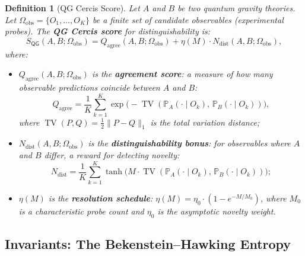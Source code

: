 \documentclass[12pt,a4paper]{article}
\newtheorem{definition}[theorem]{Definition}
\theoremstyle{remark}
\newcommand{\Pbb}{\mathbb{P}}
\newcommand{\Cercis}{\textsf{Cercis}}
\newcommand{\QG}{\textsf{QG}}
\DeclareMathOperator{\TV}{TV}
\begin{document}
\begin{definition}[QG Cercis Score]
\label{def:qg_cercis}
Let $A$ and $B$ be two quantum gravity theories. Let $\Omega_{\text{obs}} = \{O_1, \ldots, O_K\}$ be a finite set of candidate observables (experimental probes). The \textbf{QG \Cercis{} score} for distinguishability is:
\begin{equation}
  \label{eq:qg_cercis_formula}
  S_{\QG}(A, B; \Omega_{\text{obs}}) = Q_{\text{agree}}(A, B; \Omega_{\text{obs}}) +
  \eta(M) \cdot N_{\text{dist}}(A, B; \Omega_{\text{obs}}),
\end{equation}
where:
\begin{itemize}[leftmargin=*]
  \item $Q_{\text{agree}}(A, B; \Omega_{\text{obs}})$ is the \textbf{agreement score}: a measure of how many observable predictions coincide between $A$ and $B$:
  \begin{equation}
    Q_{\text{agree}} = \frac{1}{K} \sum_{k=1}^{K}
    \exp\!\bigl(- \TV(\Pbb_A(\cdot \mid O_k),\, \Pbb_B(\cdot \mid O_k))\bigr),
  \end{equation}
  where $\TV(P, Q) = \frac{1}{2}\|P - Q\|_1$ is the total variation distance;

  \item $N_{\text{dist}}(A, B; \Omega_{\text{obs}})$ is the \textbf{distinguishability bonus}: for observables where $A$ and $B$ differ, a reward for detecting novelty:
  \begin{equation}
    N_{\text{dist}} = \frac{1}{K} \sum_{k=1}^{K}
    \tanh\!\bigl(M \cdot \TV(\Pbb_A(\cdot \mid O_k),\, \Pbb_B(\cdot \mid O_k))\bigr);
  \end{equation}

  \item $\eta(M)$ is the \textbf{resolution schedule}: $\eta(M) = \eta_0 \cdot (1 - e^{-M/M_0})$, where $M_0$ is a characteristic probe count and $\eta_0$ is the asymptotic novelty weight.
\end{itemize}
\end{definition}

\subsection{Invariants: The Bekenstein--Hawking Entropy}
\end{document}
